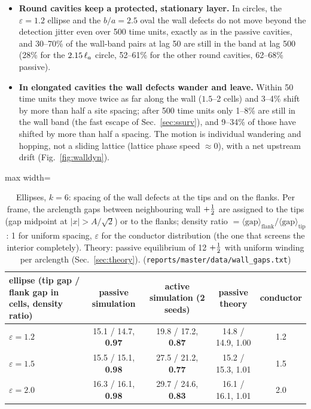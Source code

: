 \begin{itemize}
  \item \textbf{Round cavities keep a protected, stationary layer.} In circles, the $\varepsilon=1.2$ ellipse and the $b/a=2.5$ oval the
        wall defects do not move beyond the detection jitter even over 500 time units, exactly as in the passive cavities, and
        30--70\% of the wall-band pairs at lag 50 are still in the band at lag 500 (28\% for the $2.15\,\ell_a$ circle, 52--61\% for the other
        round cavities, 62--68\% passive).
  \item \textbf{In elongated cavities the wall defects wander and leave.} Within 50 time units they move twice as far along the wall
        ($1.5$--2 cells) and 3--4\% shift by more than half a site spacing; after 500 time units only 1--8\% are still in the wall band
        (the fast escape of Sec.~\ref{sec:ssurv}), and 9--34\% of those have shifted by more than half a spacing. The motion is
        individual wandering and hopping, not a sliding lattice (lattice phase speed $\approx0$), with a net upstream drift
        (Fig.~\ref{fig:walldyn}).
\end{itemize}
\begin{table}[H]\centering\small
\caption{Ellipses, $k=6$: spacing of the wall defects at the tips and on the flanks. Per frame, the arclength gaps between neighbouring wall
$+\tfrac12$ are assigned to the tips (gap midpoint at $|x|>A/\sqrt2$) or to the flanks; density ratio $=\langle\text{gap}\rangle_\text{flank}/
\langle\text{gap}\rangle_\text{tip}$: 1 for uniform spacing, $\varepsilon$ for the conductor distribution (the one that screens the interior
completely). Theory: passive equilibrium of 12 $+\tfrac12$ with uniform winding per arclength (Sec.~\ref{sec:theory}).
(\texttt{reports/master/data/wall\_gaps.txt})}\label{tab:tips}
\begin{adjustbox}{max width=\textwidth}
\begin{tabular}{lcccc}\toprule
ellipse (tip gap / flank gap in cells, density ratio) & passive simulation & active simulation (2 seeds) & passive theory & conductor\\\midrule
$\varepsilon=1.2$ & 15.1 / 14.7, \textbf{0.97} & 19.8 / 17.2, \textbf{0.87} & 14.8 / 14.9, 1.00 & 1.2\\
$\varepsilon=1.5$ & 15.5 / 15.1, \textbf{0.98} & 27.5 / 21.2, \textbf{0.77} & 15.2 / 15.3, 1.01 & 1.5\\
$\varepsilon=2.0$ & 16.3 / 16.1, \textbf{0.98} & 29.7 / 24.6, \textbf{0.83} & 16.1 / 16.1, 1.01 & 2.0\\\bottomrule
\end{tabular}
\end{adjustbox}
\end{table}
